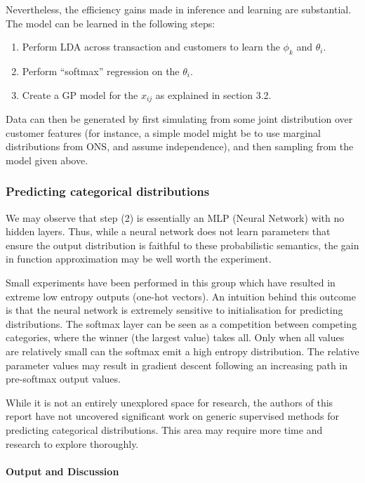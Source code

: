\documentclass[]{article}
\begin{document}
Nevertheless, the efficiency gains made in inference and learning are
substantial. The model can be learned in the following steps:

\begin{enumerate}
\def\labelenumi{\arabic{enumi}.}
\tightlist
\item
  Perform LDA across transaction and customers to learn the \(\phi_k\)
  and \(\theta_i\).
\item
  Perform ``softmax'' regression on the \(\theta_i\).
\item
  Create a GP model for the \(x_{ij}\) as explained in section 3.2.
\end{enumerate}

Data can then be generated by first simulating from some joint
distribution over customer features (for instance, a simple model might
be to use marginal distributions from ONS, and assume independence), and
then sampling from the model given above.

\subsubsection{Predicting categorical
distributions}\label{predicting-categorical-distributions}

We may observe that step (2) is essentially an MLP (Neural Network) with
no hidden layers. Thus, while a neural network does not learn parameters
that ensure the output distribution is faithful to these probabilistic
semantics, the gain in function approximation may be well worth the
experiment.

Small experiments have been performed in this group which have resulted
in extreme low entropy outputs (one-hot vectors). An intuition behind
this outcome is that the neural network is extremely sensitive to
initialisation for predicting distributions. The softmax layer can be
seen as a competition between competing categories, where the winner
(the largest value) takes all. Only when all values are relatively small
can the softmax emit a high entropy distribution. The relative parameter
values may result in gradient descent following an increasing path in
pre-softmax output values.

While it is not an entirely unexplored space for research, the authors
of this report have not uncovered significant work on generic supervised
methods for predicting categorical distributions. This area may require
more time and research to explore thoroughly.

\paragraph{Output and Discussion}\label{output-and-discussion}
\end{document}
